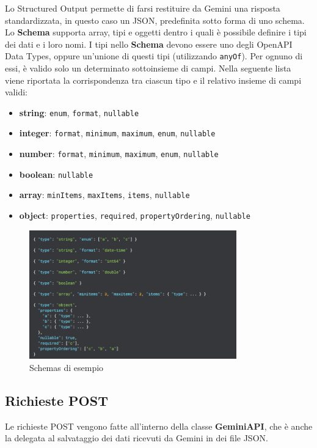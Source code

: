 Lo Structured Output permette di farsi restituire da Gemini una risposta standardizzata, in questo caso un JSON, predefinita sotto forma di uno schema. Lo \textbf{Schema} supporta array, tipi e oggetti dentro i quali è possibile definire i tipi dei dati e i loro nomi. \cite{StructuredOutput}
I tipi nello \textbf{Schema} devono essere uno degli OpenAPI Data Types, oppure un'unione di questi tipi (utilizzando \texttt{anyOf}). Per ognuno di essi, è valido solo un determinato sottoinsieme di campi. Nella seguente lista viene riportata la corrispondenza tra ciascun tipo e il relativo insieme di campi validi:
\begin{itemize}
    \item \textbf{string}: \texttt{enum}, \texttt{format}, \texttt{nullable}
    \item \textbf{integer}: \texttt{format}, \texttt{minimum}, \texttt{maximum}, \texttt{enum}, \texttt{nullable}
    \item \textbf{number}: \texttt{format}, \texttt{minimum}, \texttt{maximum}, \texttt{enum}, \texttt{nullable}
    \item \textbf{boolean}: \texttt{nullable}
    \item \textbf{array}: \texttt{minItems}, \texttt{maxItems}, \texttt{items}, \texttt{nullable}
    \item \textbf{object}: \texttt{properties}, \texttt{required}, \texttt{propertyOrdering}, \texttt{nullable}
\end{itemize}

\begin{figure}[H]
    \centering
    \includegraphics[width=0.8\textwidth,height=\textheight,keepaspectratio]{figures/chapter_1/GeminiSchema.png}
    \caption{Schemas di esempio}
\end{figure}

\subsection{Richieste POST}
Le richieste POST vengono fatte all'interno della classe \textbf{GeminiAPI}, che è anche la delegata al salvataggio dei dati ricevuti da Gemini in dei file JSON.

